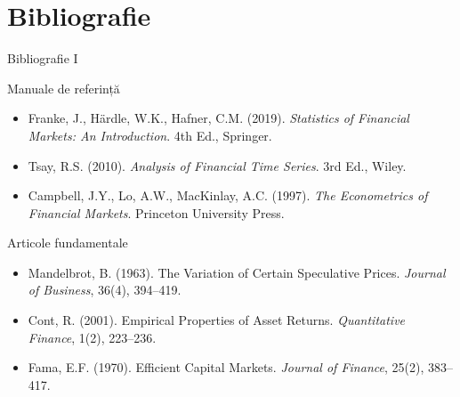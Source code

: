 \documentclass[9pt, aspectratio=169, t]{beamer}
\theoremstyle{definition}
\newenvironment{cminipage}[1]{%
    \par\noindent\hfill\begin{minipage}{#1}\ignorespaces
}{%
    \end{minipage}\hfill\null\par
}
\begin{document}
\section{Bibliografie}

\begin{frame}{Bibliografie I}
    \begin{cminipage}{0.95\textwidth}
    \begin{block}{Manuale de referință}
        {\small
        \begin{itemize}\setlength{\itemsep}{0pt}
            \item Franke, J., H\"{a}rdle, W.K., Hafner, C.M. (2019). \textit{Statistics of Financial Markets: An Introduction}. 4th Ed., Springer.
            \item Tsay, R.S. (2010). \textit{Analysis of Financial Time Series}. 3rd Ed., Wiley.
            \item Campbell, J.Y., Lo, A.W., MacKinlay, A.C. (1997). \textit{The Econometrics of Financial Markets}. Princeton University Press.
        \end{itemize}
        }
    \end{block}

    \begin{exampleblock}{Articole fundamentale}
        {\small
        \begin{itemize}\setlength{\itemsep}{0pt}
            \item Mandelbrot, B. (1963). The Variation of Certain Speculative Prices. \textit{Journal of Business}, 36(4), 394--419.
            \item Cont, R. (2001). Empirical Properties of Asset Returns. \textit{Quantitative Finance}, 1(2), 223--236.
            \item Fama, E.F. (1970). Efficient Capital Markets. \textit{Journal of Finance}, 25(2), 383--417.
        \end{itemize}
        }
    \end{exampleblock}
    \end{cminipage}
\end{frame}
\end{document}
